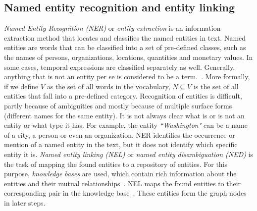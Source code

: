 \subsection{Named entity recognition and  entity linking}\label{subsec:entity_recog}
\emph{Named Entity Recognition (NER)}  or \emph{entity extraction} is an information extraction method that locates and classifies the named entities in text. Named entities are words that can be classified into a set of pre-defined classes, such as the names of persons, organizations, locations, quantities and monetary values. In some cases, temporal expressions are classified separately as well. Generally, anything that is not an entity per se is considered to be a term.~. More formally, if we define $V$ as the set of all words in the vocabulary, $N\subseteq V$ is the set of all entities that fall into a pre-defined category.
Recognition of entities is difficult, partly because of ambiguities and mostly because of multiple surface forms (different names for the same entity).
It is not always clear what is or is not an entity or what type it has. For example, the entity \emph{``Washington"} can be a name of a city, a person or even an organization. NER identifies the occurrence or mention of a named entity in the text, but it does not identify which specific entity it is. \emph{Named entity linking (NEL)} or \emph{named entity disambiguation (NED)} is the task of mapping the found entities to a repository of entities. For this purpose, \emph{knowledge bases} are used, which contain rich information about the entities and their mutual relationships~. NEL maps the found entities to their corresponding pair in the knowledge base~. 
These entities form the graph nodes in later steps. 

